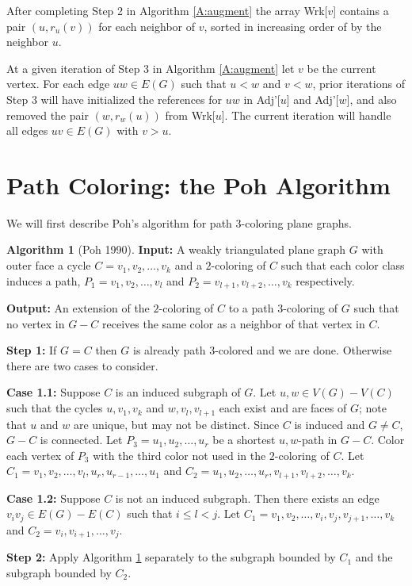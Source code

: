 \documentclass[12pt,letterpaper]{article}
\theoremstyle{plain}
\theoremstyle{definition}
\theoremstyle{break}
\newtheorem{algorithm}[lemma]{Algorithm}     %
\begin{document}
After completing Step 2 in Algorithm \ref{A:augment} the array Wrk[$v$] contains
a pair $(u,r_u(v))$ for each neighbor of $v$, sorted in increasing order of by
the neighbor $u$.

At a given iteration of Step 3 in Algorithm \ref{A:augment} let $v$ be the
current vertex. For each edge $uw\in E(G)$ such that
$u<w$ and $v<w$, prior iterations of Step 3 will have initialized the
references for $uw$ in Adj'[$u$] and Adj'[$w$], and also removed the pair
$(w,r_w(u))$ from Wrk[$u$]. The current iteration will handle all edges
$uv\in E(G)$ with $v>u$.

\section{Path Coloring: the Poh Algorithm}

We will first describe Poh's algorithm for path $3$-coloring plane graphs.

\begin{algorithm}[Poh 1990] \label{A:planar3}
\textbf{Input:} A weakly triangulated plane graph $G$ with outer face a
cycle $C=v_1,v_2,\ldots, v_k$ and a $2$-coloring of $C$ such
that each color class induces a path, $P_1=v_1,v_2,\ldots, v_l$ and
$P_2=v_{l+1},v_{l+2},\ldots, v_k$ respectively.

\noindent\textbf{Output:} An extension of the $2$-coloring of $C$ to a path
$3$-coloring of $G$ such that no vertex in $G-C$ receives the same color as a
neighbor of that vertex in $C$.

\noindent\textbf{Step 1:} If $G=C$ then $G$ is already path $3$-colored and we
are done. Otherwise there are two cases to consider.

\noindent\textbf{Case 1.1:} Suppose $C$ is an induced subgraph of $G$. Let
$u,w\in V(G)-V(C)$ such that the cycles $u,v_1,v_k$ and $w,v_l,v_{l+1}$ each
exist and are faces of $G$; note that
$u$ and $w$ are unique, but may not be distinct. Since $C$ is induced and
$G\ne C$, $G-C$ is connected.
Let $P_3=u_1,u_2,\ldots,u_r$ be a shortest $u,w$-path in $G-C$.
Color each vertex of $P_3$ with the third color not used in the $2$-coloring of
$C$. Let $C_1=v_1,v_2,\ldots,v_l,u_r,u_{r-1},\ldots,u_1$ and
$C_2=u_1,u_2,\ldots,u_r,v_{l+1},v_{l+2},\ldots,v_k$.

\noindent\textbf{Case 1.2:} Suppose $C$ is not an induced subgraph. Then there
exists an edge $v_iv_j\in E(G)-E(C)$ such that $i\le l < j$. Let
$C_1=v_1,v_2,\ldots,v_i,v_j,v_{j+1},\ldots,v_k$
and $C_2=v_i,v_{i+1},\ldots,v_j$.

\noindent\textbf{Step 2:} Apply Algorithm \ref{A:planar3} separately to the
subgraph bounded by $C_1$ and the subgraph bounded by $C_2$.
\end{algorithm}
\end{document}
